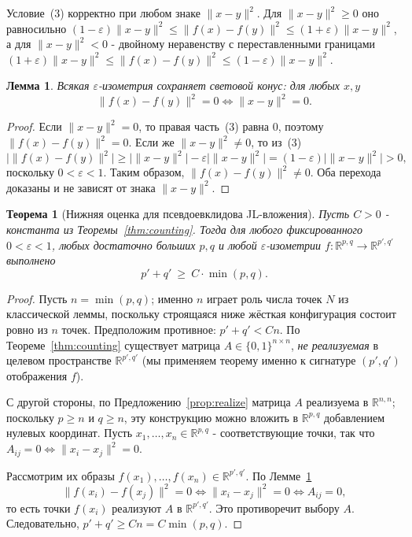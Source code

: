 \documentclass[12pt]{article}
\newtheorem{theorem}{Теорема}
\newtheorem{lemma}{Лемма}
\newcommand{\R}{\mathbb{R}}
\begin{document}
Условие~(3) корректно при любом знаке \(\|x-y\|^2\). Для \(\|x-y\|^2\ge 0\) оно равносильно
\((1-\varepsilon)\|x-y\|^2\le \|f(x)-f(y)\|^2\le (1+\varepsilon)\|x-y\|^2\),
а для \(\|x-y\|^2<0\) - двойному неравенству с переставленными границами
\((1+\varepsilon)\|x-y\|^2\le \|f(x)-f(y)\|^2\le (1-\varepsilon)\|x-y\|^2\).

\begin{lemma}\label{lem:cone}
Всякая \(\varepsilon\)-изометрия сохраняет световой конус: для любых \(x,y\)
\[
\|f(x)-f(y)\|^2 = 0 \iff \|x-y\|^2 = 0 .
\]
\end{lemma}

\begin{proof}
Если \(\|x-y\|^2=0\), то правая часть~(3) равна \(0\), поэтому \(\|f(x)-f(y)\|^2=0\).
Если же \(\|x-y\|^2\ne0\), то из~(3)
\[
\bigl|\|f(x)-f(y)\|^2\bigr| \ge \bigl|\|x-y\|^2\bigr| - \varepsilon\bigl|\|x-y\|^2\bigr| = (1-\varepsilon)\bigl|\|x-y\|^2\bigr| > 0,
\]
поскольку \(0<\varepsilon<1\). Таким образом, \(\|f(x)-f(y)\|^2\ne0\). Оба перехода доказаны и не зависят от знака \(\|x-y\|^2\).
\end{proof}

\begin{theorem}[Нижняя оценка для псевдоевклидова JL-вложения]\label{thm:jl}
Пусть \(C>0\) - константа из Теоремы~\ref{thm:counting}. Тогда для любого фиксированного \(0<\varepsilon<1\), любых достаточно больших \(p,q\) и любой \(\varepsilon\)-изометрии \(f:\R^{p,q}\to\R^{p',q'}\) выполнено
\[
p' + q' \ \ge\ C\cdot \min(p,q).
\]
\end{theorem}

\begin{proof}
Пусть \(n=\min(p,q)\); именно \(n\) играет роль числа точек \(N\) из классической леммы, поскольку строящаяся ниже жёсткая конфигурация состоит ровно из \(n\) точек. Предположим противное: \(p'+q' < C n\). По Теореме~\ref{thm:counting} существует матрица \(A\in\{0,1\}^{n\times n}\), \emph{не реализуемая} в целевом пространстве \(\R^{p',q'}\) (мы применяем теорему именно к сигнатуре \((p',q')\) отображения \(f\)).

С другой стороны, по Предложению~\ref{prop:realize} матрица \(A\) реализуема в \(\R^{n,n}\); поскольку \(p\ge n\) и \(q\ge n\), эту конструкцию можно вложить в \(\R^{p,q}\) добавлением нулевых координат. Пусть \(x_1,\dots,x_n\in\R^{p,q}\) - соответствующие точки, так что \(A_{ij}=0\iff\|x_i-x_j\|^2=0\).

Рассмотрим их образы \(f(x_1),\dots,f(x_n)\in\R^{p',q'}\). По Лемме~\ref{lem:cone}
\[
\|f(x_i)-f(x_j)\|^2 = 0 \iff \|x_i-x_j\|^2 = 0 \iff A_{ij}=0,
\]
то есть точки \(f(x_i)\) реализуют \(A\) в \(\R^{p',q'}\). Это противоречит выбору \(A\). Следовательно, \(p'+q'\ge C n = C\min(p,q)\).
\end{proof}
\end{document}
